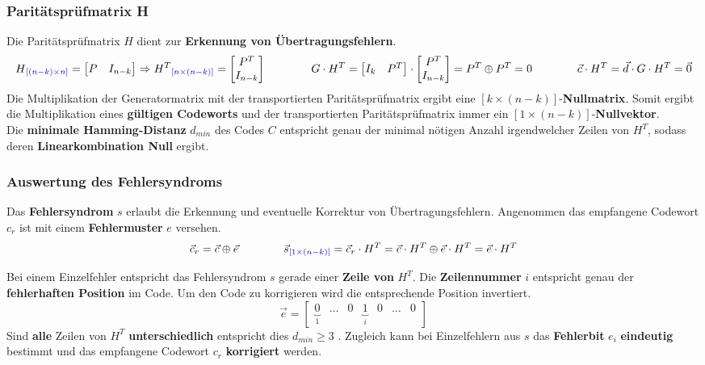 \subsubsection{Paritätsprüfmatrix H} \label{paritycheckmatrix}
Die Paritätsprüfmatrix $H$ dient zur \textbf{Erkennung von Übertragungsfehlern}. 
$$H\textcolor{blue}{_{[(n-k) \times n]}} = \begin{bmatrix}P & I_{n-k}\end{bmatrix} \Rightarrow
H^T\textcolor{blue}{_{[n \times (n-k)]}} =
\begin{bmatrix} P^T \\ I_{n-k}\end{bmatrix} 
\qquad \qquad 
G \cdot H^T = \begin{bmatrix}I_k & P^T\end{bmatrix} \cdot 
 \begin{bmatrix} P^T \\ I_{n-k}\end{bmatrix} = P^T \oplus P^T = 0
	\qquad \qquad
	\vec{c} \cdot H^T = \vec{d} \cdot G \cdot H^T = \vec{0}
	 $$
Die Multiplikation der Generatormatrix mit der transportierten Paritätsprüfmatrix ergibt eine 
$[k \times (n-k)]$-\textbf{Nullmatrix}. Somit ergibt die Multiplikation eines
\textbf{gültigen Codeworts} und der transportierten Paritätsprüfmatrix immer ein $[1
\times (n-k)]$-\textbf{Nullvektor}. \\
Die \textbf{minimale Hamming-Distanz} $d_{min}$ des Codes $C$ entspricht genau der minimal
nötigen Anzahl irgendwelcher Zeilen von $H^T$, sodass deren \textbf{Linearkombination Null} ergibt.


\subsubsection{Auswertung des Fehlersyndroms}
Das \textbf{Fehlersyndrom} $s$ erlaubt die Erkennung und eventuelle Korrektur von Übertragungsfehlern.
Angenommen das empfangene Codewort $c_r$ ist mit einem \textbf{Fehlermuster} $e$ versehen.
$$\vec{c}_r = \vec{c} \oplus \vec{e} \qquad \qquad \vec{s}\textcolor{blue}{_{[1 \times (n-k)]}} = \vec{c}_r \cdot H^T = \vec{c}
\cdot H^T \oplus \vec{e} \cdot H^T = \vec{e} \cdot H^T$$

Bei einem Einzelfehler entspricht das Fehlersyndrom $s$ gerade einer \textbf{Zeile von }
\boldmath$H^T$\unboldmath . Die \textbf{Zeilennummer} $i$ entspricht genau der \textbf{fehlerhaften
Position} im Code. Um den Code zu korrigieren wird die entsprechende Position invertiert.
$$ \vec{e} = \begin{bmatrix} \underbrace{0}_{1} & \ldots & 0 & \underbrace{1}_i & 0 & \ldots & 0\end{bmatrix} $$ 
Sind \textbf{alle} Zeilen von $H^T$ \textbf{unterschiedlich} entspricht dies \boldmath $d_{min}
\geq 3$ \unboldmath . 
Zugleich kann bei Einzelfehlern aus $s$ das \textbf{Fehlerbit} $e_i$ \textbf{eindeutig} bestimmt und das 
empfangene Codewort $c_r$ \textbf{korrigiert} werden. \\

